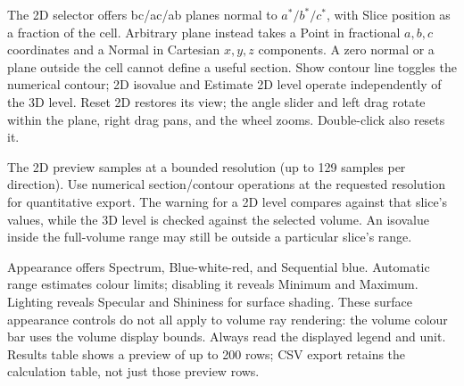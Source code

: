 The 2D selector offers bc/ac/ab planes normal to $a^*/b^*/c^*$, with Slice position as a fraction of the cell. Arbitrary plane instead takes a Point in fractional $a,b,c$ coordinates and a Normal in Cartesian $x,y,z$ components. A zero normal or a plane outside the cell cannot define a useful section. Show contour line toggles the numerical contour; 2D isovalue and Estimate 2D level operate independently of the 3D level. Reset 2D restores its view; the angle slider and left drag rotate within the plane, right drag pans, and the wheel zooms. Double-click also resets it.

The 2D preview samples at a bounded resolution (up to 129 samples per direction). Use numerical section/contour operations at the requested resolution for quantitative export. The warning for a 2D level compares against that slice's values, while the 3D level is checked against the selected volume. An isovalue inside the full-volume range may still be outside a particular slice's range.

Appearance offers Spectrum, Blue-white-red, and Sequential blue. Automatic range estimates colour limits; disabling it reveals Minimum and Maximum. Lighting reveals Specular and Shininess for surface shading. These surface appearance controls do not all apply to volume ray rendering: the volume colour bar uses the volume display bounds. Always read the displayed legend and unit. Results table shows a preview of up to 200 rows; CSV export retains the calculation table, not just those preview rows.
